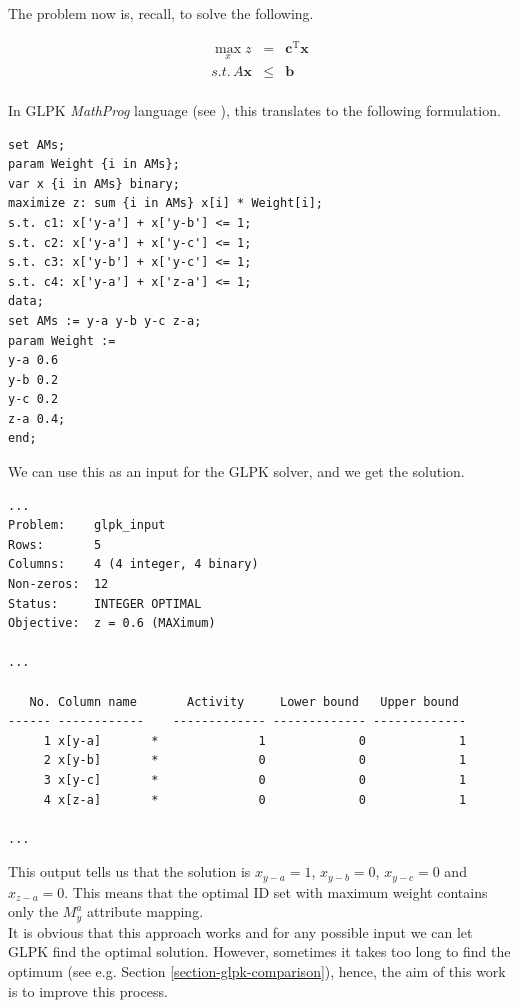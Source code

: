 The problem now is, recall, to solve the following.

\begin{eqnarray*}
\max_{x} z & = & \mathbf{c}^{\mathrm{T}}\mathbf{x} \\
s.t.\, A\mathbf{x} & \leqslant & \mathbf{b} \\
\end{eqnarray*}

In GLPK \textit{MathProg} language (see \cite{mathprog}), this translates to the following formulation.

\begin{scriptsize}
\begin{verbatim}
set AMs;
param Weight {i in AMs};
var x {i in AMs} binary;
maximize z: sum {i in AMs} x[i] * Weight[i];
s.t. c1: x['y-a'] + x['y-b'] <= 1;
s.t. c2: x['y-a'] + x['y-c'] <= 1;
s.t. c3: x['y-b'] + x['y-c'] <= 1;
s.t. c4: x['y-a'] + x['z-a'] <= 1;
data;
set AMs := y-a y-b y-c z-a;
param Weight :=
y-a 0.6
y-b 0.2
y-c 0.2
z-a 0.4;
end;
\end{verbatim}
\end{scriptsize}

We can use this as an input for the GLPK solver, and we get the solution.

\begin{scriptsize}
\begin{verbatim}
...
Problem:    glpk_input
Rows:       5
Columns:    4 (4 integer, 4 binary)
Non-zeros:  12
Status:     INTEGER OPTIMAL
Objective:  z = 0.6 (MAXimum)

...

   No. Column name       Activity     Lower bound   Upper bound
------ ------------    ------------- ------------- -------------
     1 x[y-a]       *              1             0             1 
     2 x[y-b]       *              0             0             1 
     3 x[y-c]       *              0             0             1 
     4 x[z-a]       *              0             0             1 

...
\end{verbatim}
\end{scriptsize}

This output tells us that the solution is $x_{y-a} = 1$, $x_{y-b} = 0$, $x_{y-c} = 0$ and $x_{z-a} = 0$. This means that the optimal ID set with maximum weight contains only the $M_{y}^{a}$ attribute mapping.\\

It is obvious that this approach works and for any possible input we can let GLPK find the optimal solution. However, sometimes it takes too long to find the optimum (see e.g. Section \ref{section-glpk-comparison}), hence, the aim of this work is to improve this process.

